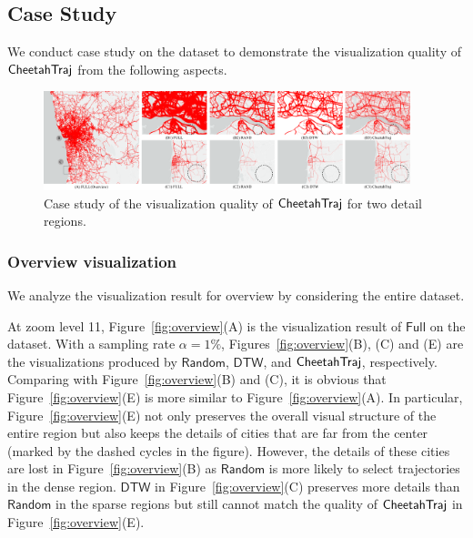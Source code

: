 \subsection{Case Study}\label{sec:case}

We conduct case study on the \pt{} dataset to demonstrate the visualization quality of $\mathsf{CheetahTraj}$ from the following aspects.

\begin{figure}[t]
	\centering
	\includegraphics[width=0.95\textwidth]{pictures/case_study_icde/case_study_detail.pdf}
	\vspace{-1mm}
	\caption{Case study of the visualization quality of $\mathsf{CheetahTraj}$ for two detail regions.}
	\label{fig:detailview}
	\vspace{-1mm}
\end{figure}

\subsubsection{Overview visualization}

We analyze the visualization result for overview by considering the entire \pt{} dataset. 

At zoom level 11, Figure~\ref{fig:overview}(A) is the visualization result of $\mathsf{Full}$ on the \pt{} dataset.
With a sampling rate $\alpha \!=\! 1\%$, Figures~\ref{fig:overview}(B), (C) and (E) are the visualizations produced by $\mathsf{Random}$, $\mathsf{DTW}$,   
and $\mathsf{CheetahTraj}$, respectively. Comparing with Figure~\ref{fig:overview}(B) and (C), it is obvious that Figure~\ref{fig:overview}(E) is more similar to Figure~\ref{fig:overview}(A). In particular, Figure~\ref{fig:overview}(E) not only preserves the overall visual structure of the entire region but also keeps the details of cities that are far from the center (marked by the dashed cycles in the figure). However, the details of these cities are lost in Figure~\ref{fig:overview}(B) as $\mathsf{Random}$ is more likely to select trajectories in the dense region. $\mathsf{DTW}$ in Figure~\ref{fig:overview}(C) preserves more details than $\mathsf{Random}$ in the sparse regions but still cannot match the quality of $\mathsf{CheetahTraj}$ in Figure~\ref{fig:overview}(E).


